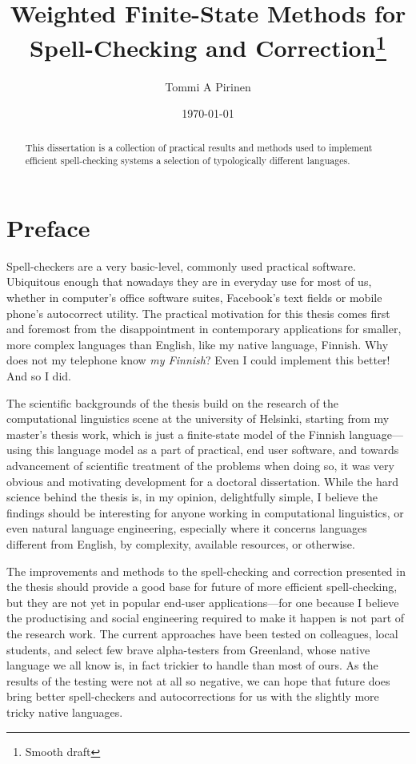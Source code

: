 \documentclass[officiallayout,draft]{unihelcompling}
\title{Weighted Finite-State Methods for 
Spell-Checking
and Correction\footnote{Smooth draft}}
\author{Tommi A Pirinen}
\date{\today}
\begin{document}
\frontmatter

\maketitle

\begin{abstract}
    This dissertation is a collection of practical results and methods used
    to implement efficient spell-checking systems a selection of typologically
    different languages.
\end{abstract}

\tableofcontents

\listoftodos

\mainmatter

\chapter*{Preface}
\label{chap:preface}

Spell-checkers are a very basic-level, commonly used practical software.
Ubiquitous enough that nowadays they are in everyday use for most of us,
whether in computer's office software suites, Facebook's text fields or mobile
phone's autocorrect utility. The practical motivation for this thesis comes
first and foremost from the disappointment in contemporary applications for
smaller, more complex languages than English, like my native language, Finnish.
Why does not my telephone know \emph{my Finnish}? Even I could implement this
better! And so I did.

The scientific backgrounds of the thesis build on the research of the
computational linguistics scene at the university of Helsinki, starting from my
master's thesis work, which is just a finite-state model of the Finnish
language---using this language model as a part of practical, end
user software, and towards advancement of scientific treatment of the problems
when doing so, it was very obvious and motivating development for a doctoral
dissertation. While the hard science behind the thesis is, in my opinion,
delightfully simple, I believe the findings should be interesting for anyone
working in computational linguistics, or even natural language engineering,
especially where it concerns languages different from English, by complexity,
available resources, or otherwise.

The improvements and methods to the spell-checking and correction presented in
the thesis should provide a good base for future of more efficient
spell-checking, but they are not yet in popular end-user applications---for one
because I believe the productising and social engineering required to make it
happen is not part of the research work. The current approaches have been
tested on colleagues, local students, and select few brave alpha-testers from
Greenland, whose native language we all know is, in fact trickier to handle
than most of ours. As the results of the testing were not at all so negative,
we can hope that future does bring better spell-checkers and autocorrections
for us with the slightly more tricky native languages.
\end{document}
